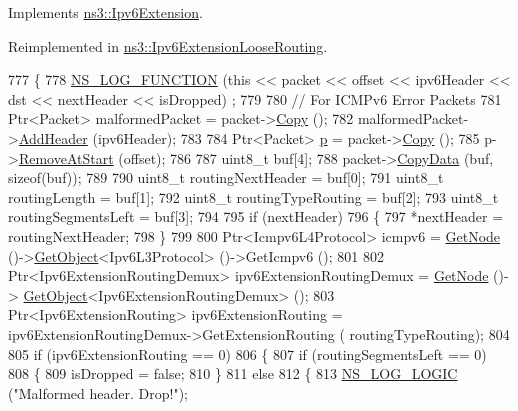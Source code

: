 Implements \hyperlink{classns3_1_1Ipv6Extension_a5946bc5e6fa07b76e2dcb7e4dee01f9f}{ns3\+::\+Ipv6\+Extension}.



Reimplemented in \hyperlink{classns3_1_1Ipv6ExtensionLooseRouting_ab73c109952d780d1eb52c2f7c144e546}{ns3\+::\+Ipv6\+Extension\+Loose\+Routing}.


\begin{DoxyCode}
777 \{
778   \hyperlink{log-macros-disabled_8h_a90b90d5bad1f39cb1b64923ea94c0761}{NS\_LOG\_FUNCTION} (\textcolor{keyword}{this} << packet << offset << ipv6Header << dst << nextHeader << isDropped)
      ;
779 
780   \textcolor{comment}{// For ICMPv6 Error Packets}
781   Ptr<Packet> malformedPacket = packet->\hyperlink{classns3_1_1Packet_a5d5c70802a5f77fc5f0001e0cfc1898b}{Copy} ();
782   malformedPacket->\hyperlink{classns3_1_1Packet_a465108c595a0bc592095cbcab1832ed8}{AddHeader} (ipv6Header);
783 
784   Ptr<Packet> \hyperlink{lte__link__budget_8m_ac9de518908a968428863f829398a4e62}{p} = packet->\hyperlink{classns3_1_1Packet_a5d5c70802a5f77fc5f0001e0cfc1898b}{Copy} ();
785   p->\hyperlink{classns3_1_1Packet_a78aa207e7921dd2f9f7e0d0b7a1c730a}{RemoveAtStart} (offset);
786 
787   uint8\_t buf[4];
788   packet->\hyperlink{classns3_1_1Packet_a5a6d304b9e0d90733919ffe224b98f0d}{CopyData} (buf, \textcolor{keyword}{sizeof}(buf));
789 
790   uint8\_t routingNextHeader = buf[0];
791   uint8\_t routingLength = buf[1];
792   uint8\_t routingTypeRouting = buf[2];
793   uint8\_t routingSegmentsLeft = buf[3];
794 
795   \textcolor{keywordflow}{if} (nextHeader)
796     \{
797       *nextHeader = routingNextHeader;
798     \}
799 
800   Ptr<Icmpv6L4Protocol> icmpv6 = \hyperlink{classns3_1_1Ipv6Extension_a71cc2e202ef7605b1f645d8c6a384657}{GetNode} ()->\hyperlink{classns3_1_1Object_a13e18c00017096c8381eb651d5bd0783}{GetObject}<Ipv6L3Protocol> ()->GetIcmpv6 ();
801 
802   Ptr<Ipv6ExtensionRoutingDemux> ipv6ExtensionRoutingDemux = \hyperlink{classns3_1_1Ipv6Extension_a71cc2e202ef7605b1f645d8c6a384657}{GetNode} ()->
      \hyperlink{classns3_1_1Object_a13e18c00017096c8381eb651d5bd0783}{GetObject}<Ipv6ExtensionRoutingDemux> ();
803   Ptr<Ipv6ExtensionRouting> ipv6ExtensionRouting = ipv6ExtensionRoutingDemux->GetExtensionRouting (
      routingTypeRouting);
804 
805   \textcolor{keywordflow}{if} (ipv6ExtensionRouting == 0)
806     \{
807       \textcolor{keywordflow}{if} (routingSegmentsLeft == 0)
808         \{
809           isDropped = \textcolor{keyword}{false};
810         \}
811       \textcolor{keywordflow}{else}
812         \{
813           \hyperlink{group__logging_ga88acd260151caf2db9c0fc84997f45ce}{NS\_LOG\_LOGIC} (\textcolor{stringliteral}{"Malformed header. Drop!"});

\end{DoxyCode}
